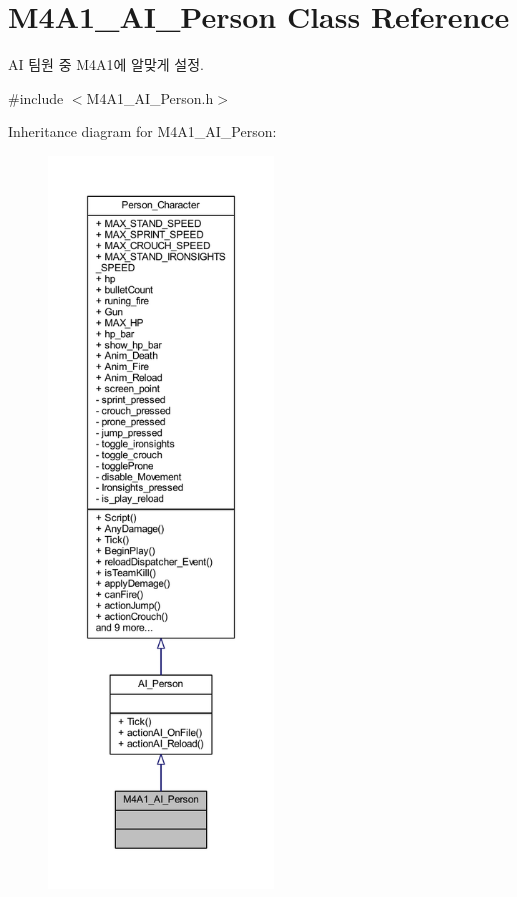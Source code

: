\hypertarget{class_m4_a1___a_i___person}{}\section{M4\+A1\+\_\+\+A\+I\+\_\+\+Person Class Reference}
\label{class_m4_a1___a_i___person}


AI 팀원 중 M4\+A1에 알맞게 설정.  




{\ttfamily \#include $<$M4\+A1\+\_\+\+A\+I\+\_\+\+Person.\+h$>$}



Inheritance diagram for M4\+A1\+\_\+\+A\+I\+\_\+\+Person\+:\nopagebreak
\begin{figure}[H]
\begin{center}
\leavevmode
\includegraphics[height=550pt]{class_m4_a1___a_i___person__inherit__graph}
\end{center}
\end{figure}


